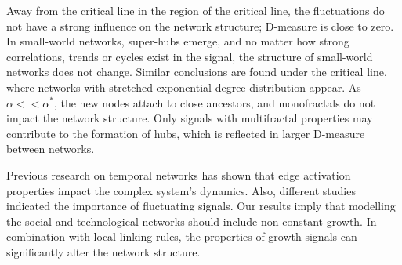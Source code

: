 Away from the critical line in the region of the critical line, the fluctuations do not have a strong influence on the network structure; D-measure is close to zero. In small-world networks, super-hubs emerge, and no matter how strong correlations, trends or cycles exist in the signal, the structure of small-world networks does not change. Similar conclusions are found under the critical line, where networks with stretched exponential degree distribution appear. As $\alpha<<\alpha^{*}$, the new nodes attach to close ancestors, and monofractals do not impact the network structure. Only signals with multifractal properties may contribute to the formation of hubs, which is reflected in larger D-measure between networks. 

Previous research on temporal networks \cite{holme2012} has shown that edge activation properties impact the complex system's dynamics. Also, different studies indicated the importance of fluctuating signals. Our results imply that modelling the social and technological networks should include non-constant growth. In combination with local linking rules, the properties of growth signals can significantly alter the network structure. 




